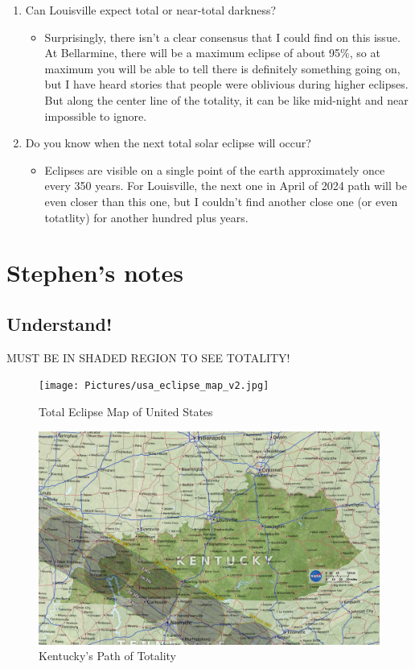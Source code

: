 \documentclass{article}
\begin{document}
\begin{enumerate}
\item Can Louisville expect total or near-total darkness?
	\begin{itemize}
	\item Surprisingly, there isn't a clear consensus that I could find on this issue.  At Bellarmine, there will be a maximum eclipse of about 95\%, so at maximum you will be able to tell there is definitely something going on, but I have heard stories that people were oblivious during higher eclipses.  But along the center line of the totality, it can be like mid-night and near impossible to ignore.
	\end{itemize}

\item Do you know when the next total solar eclipse will occur?
	\begin{itemize}
	\item Eclipses are visible on a single point of the earth  approximately once every 350 years.  For Louisville, the next one in April of 2024 path will be even closer than this one, but I couldn't find another close one (or even totatlity) for another hundred plus years.
	\end{itemize}

\end{enumerate}

\section{Stephen's notes}

\subsection{Understand!}
MUST BE IN SHADED REGION TO SEE TOTALITY!
\begin{figure}[h]
\centering
\texttt{[image: Pictures/usa\_eclipse\_map\_v2.jpg]}
\caption{Total Eclipse Map of United States}
\end{figure}

\begin{figure}
\includegraphics[scale=.3]{Pictures/Ky_eclipse_path.jpg}
\caption{Kentucky's Path of Totality}
\end{figure}
\end{document}
